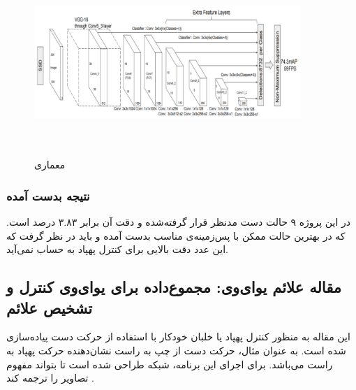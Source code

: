 \begin{figure}[h]
    \centering
    \includegraphics[height=7cm,width=0.9\textwidth]{VGG16.png}
    \caption[معماری ]{معماری \cite{hadri2018hand}}
\end{figure}

\subsubsection{نتیجه بدست آمده}
 در این پروژه ۹ حالت دست مدنظر قرار گرفته‌شده و دقت آن برابر ۳.۸۳ درصد است.
 که در بهترین حالت ممکن با پس‌زمینه‌ی مناسب بدست آمده و باید در نظر گرفت که این عدد دقت بالایی برای کنترل پهپاد به حساب نمی‌آید.


\subsection[مقاله  علائم یو‌ای‌وی: مجموع‌داده برای یو‌ای‌وی کنترل و تشخيص علائم]{مقاله  علائم یو‌ای‌وی: مجموع‌داده برای یو‌ای‌وی کنترل و تشخيص علائم \protect{}}
این مقاله به منظور کنترل پهپاد یا خلبان خودکار با استفاده از حرکت دست پیاده‌سازی شده است. به عنوان مثال، حرکت دست از چپ به راست نشان‌دهنده حرکت پهپاد به راست می‌باشد. 
برای اجرای این برنامه، شبکه  طراحی شده است تا بتواند مفهوم تصاویر را ترجمه کند \cite{perera2018uav}.

